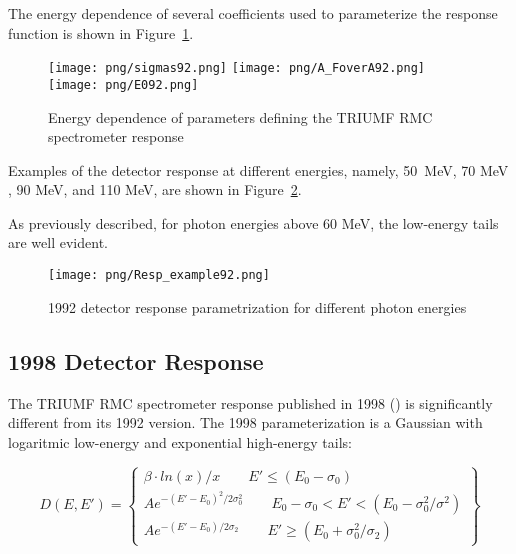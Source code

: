 The energy dependence of several coefficients used to parameterize the response
function is shown in Figure~\ref{fig:parameterDependence}.

\begin{figure}[!h]
  \begin{center}
    \texttt{[image: png/sigmas92.png]} 
    \texttt{[image: png/A\_FoverA92.png]} 
    \texttt{[image: png/E092.png]} 
  \end{center}
  \caption{
    Energy dependence of parameters defining the TRIUMF RMC spectrometer response
    \cite{RMC_1992_PhysRevC.46.1094}
  }
  \label{fig:parameterDependence}
\end{figure}

Examples of the detector response at different energies, namely, \mbox{50 MeV},
70 MeV , 90 MeV, and 110 MeV, are shown in Figure~\ref{fig:92ResponseExample}.

As previously described, for photon energies above 60 MeV, the low-energy tails are well evident.

\begin{figure}[!h]
\centering
\texttt{[image: png/Resp\_example92.png]}
\caption{1992 detector response parametrization for different photon energies}
\label{fig:92ResponseExample}
\end{figure}


\subsection { 1998 Detector Response }

The TRIUMF RMC spectrometer response published in 1998 (\cite{RMC_1998_PhysRevC.58.1767})
is significantly different from its 1992 version.
The 1998 parameterization is a Gaussian with logaritmic low-energy and exponential
high-energy tails:

\begin{equation}
  D(E,E')= \left\{
    \begin{array}{ll}
      \beta \cdot ln(x)/x    \qquad E' \leq (E_0-\sigma_0) \\
      Ae^{-(E'-E_0)^2/2\sigma_0^2} \qquad E_0-\sigma_0<E'<(E_0-\sigma_0^2/\sigma^2) \\
      Ae^{-(E'-E_0)/2\sigma_2}    \qquad E' \geq (E_0+\sigma_0^2/\sigma_2)
    \end{array}
  \right\}
\end{equation}

